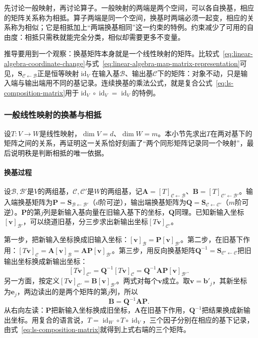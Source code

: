 先讨论一般映射，再讨论算子。一般映射的两端是两个空间，可以各自换基，相应的矩阵关系称为相抵。算子两端是同一个空间，换基时两端必须一起变，相应的关系称为相似；它是相抵加上“两端换基相同”这一约束的特例。约束减少了可用的自由度：相抵只需秩就能完全分类，相似却需要更多不变量。

推导要用到一个观察：换基矩阵本身就是一个线性映射的矩阵。比较式~\eqref{eq:linear-algebra-coordinate-change}与式~\eqref{eq:linear-algebra-map-matrix-representation}可见，$\bm S_{\mathcal C\leftarrow\mathcal B}$正是恒等映射$\operatorname{id}_V$在输入基$\mathcal B$、输出基$\mathcal C$下的矩阵：对象不动，只是输入端与输出端用不同的基记录。连续换基的乘法公式，就是复合公式~\eqref{eq:ls-composition-matrix}用于$\operatorname{id}_V\circ\operatorname{id}_V=\operatorname{id}_V$的特例。

\subsubsection{一般线性映射的换基与相抵}
\label{sec:ls-equivalence-matrices}

设$T:V\to W$是线性映射，$\dim V=d$、$\dim W=m$。本小节先求出$T$在两对基下的矩阵之间的关系，再证明这一关系恰好刻画了“两个同形矩阵记录同一个映射”，最后说明秩是判断相抵的唯一依据。

\paragraph{换基过程}
设$\mathcal B,\mathcal B'$是$V$的两组基，$\mathcal C,\mathcal C'$是$W$的两组基，记$\bm A=[T]_{\mathcal C\leftarrow\mathcal B}$、$\bm B=[T]_{\mathcal C'\leftarrow\mathcal B'}$。输入端换基矩阵为$\bm P=\bm S_{\mathcal B\leftarrow\mathcal B'}$（$d$阶可逆），输出端换基矩阵为$\bm Q=\bm S_{\mathcal C\leftarrow\mathcal C'}$（$m$阶可逆）。$\bm P$的第$j$列是新输入基向量在旧输入基下的坐标，$\bm Q$同理。已知新输入坐标$[\bm v]_{\mathcal B'}$，可以绕道旧基，分三步求出新输出坐标$[T\bm v]_{\mathcal C'}$。

第一步，把新输入坐标换成旧输入坐标：$[\bm v]_{\mathcal B}=\bm P[\bm v]_{\mathcal B'}$。第二步，在旧基下作用：$[T\bm v]_{\mathcal C}=\bm A[\bm v]_{\mathcal B}=\bm A\bm P[\bm v]_{\mathcal B'}$。第三步，用反向换基矩阵$\bm Q^{-1}=\bm S_{\mathcal C'\leftarrow\mathcal C}$把旧输出坐标换成新输出坐标：
\[
 [T\bm v]_{\mathcal C'}=\bm Q^{-1}[T\bm v]_{\mathcal C}=\bm Q^{-1}\bm A\bm P[\bm v]_{\mathcal B'}.
\]
另一方面，按定义$[T\bm v]_{\mathcal C'}=\bm B[\bm v]_{\mathcal B'}$。两式对每个$\bm v$成立。取$\bm v=\bm b'_j$，其新坐标为$\bm e_j$，两边读出的是两个矩阵的第$j$列，所以
\begin{equation}
 \bm B=\bm Q^{-1}\bm A\bm P.
 \label{eq:ls-equivalence-transform}
\end{equation}
从右向左读：$\bm P$把新输入坐标换成旧坐标，$\bm A$在旧基下作用，$\bm Q^{-1}$把结果换成新输出坐标。用复合的语言说，$T=\operatorname{id}_W\circ T\circ\operatorname{id}_V$，三个因子分别在相应的基下记录，由式~\eqref{eq:ls-composition-matrix}就得到上式右端的三个矩阵。

